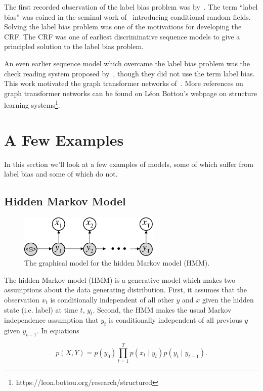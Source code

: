 \documentclass[11pt, letterpaper]{article}
\begin{document}
The first recorded observation of the label bias problem
was by~\citet{bottou1991}. The term ``label bias'' was coined in the seminal work
of~\citet{lafferty2001} introducing conditional random
fields. Solving the label bias problem was one of the
motivations for developing the CRF. The CRF was one of earliest discriminative
sequence models to give a principled solution to the label bias problem.

An even earlier sequence model which overcame the label bias problem was the
check reading system proposed by~\citet{denker1994}, though they did not use
the term label bias. This work motivated the graph transformer networks
of~\citet{bottou1997}. More references on graph transformer networks can be
found on Léon Bottou's webpage on structure learning
systems\footnote{https://leon.bottou.org/research/structured}.

\section{A Few Examples}

In this section we'll look at a few examples of models, some of which suffer
from label bias and some of which do not.

\subsection{Hidden Markov Model}

\begin{figure}
    \centering
    \includegraphics[width=0.6\textwidth]{figures/hmm.pdf}
    \caption{The graphical model for the hidden Markov model (HMM).}
    \label{fig:hmm}
\end{figure}

The hidden Markov model (HMM) is a generative model which makes two assumptions
about the data generating distribution. First, it assumes that the observation
$x_t$ is conditionally independent of all other $y$ and $x$ given the hidden
state (i.e. label) at time $t$, $y_t$. Second, the HMM makes the usual Markov
independence assumption that $y_t$ is conditionally independent of all previous
$y$ given $y_{t-1}$. In equations

\begin{equation}
p(X, Y) = p(y_0) \prod_{t=1}^T p(x_t \mid y_t) p(y_t \mid y_{t-1}).
\end{equation}
\end{document}
